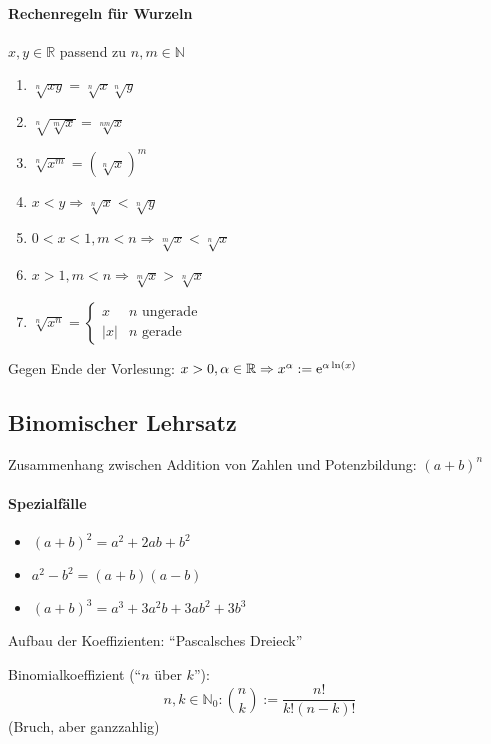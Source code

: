 \paragraph{Rechenregeln für Wurzeln} $x,y \in \mathbb{R}$ passend zu $n,m \in\mathbb{N}$
\begin{enumerate}
 \item $\sqrt[n]{xy} = \sqrt[n]x \sqrt[n]y$
 \item $\sqrt[n]{\sqrt[m]x} = \sqrt[nm]x$
 \item $\sqrt[n]{x^m} = (\sqrt[n]x)^m$
 \item $x<y \Rightarrow \sqrt[n]x < \sqrt[n]y$
 \item $0<x<1, m<n \Rightarrow \sqrt[m]{x} < \sqrt[n]{x}$
 \item $x>1, m<n \Rightarrow \sqrt[m]x > \sqrt[n]x$
 \item $\sqrt[n]{x^n} = \begin{cases} x & n \text{ ungerade} \\ |x| & n \text{ gerade} \end{cases}$
\end{enumerate}


\induction

Gegen Ende der Vorlesung: $x > 0, \alpha \in \mathbb{R} \Rightarrow x^\alpha := \operatorname{e}^{\alpha \operatorname{ln}(x)}$

\subsection{Binomischer Lehrsatz}

Zusammenhang zwischen Addition von Zahlen und Potenzbildung: $(a+b)^n$
\paragraph{Spezialfälle}
\begin{itemize}
 \item $(a+b)^2 = a^2+2ab+b^2$
 \item $a^2-b^2 = (a+b)(a-b)$
 \item $(a+b)^3=a^3+3a^2b+3ab^2+3b^3$
\end{itemize}

Aufbau der Koeffizienten: ``Pascalsches Dreieck''

\begin{definition} Binomialkoeffizient (``$n$ über $k$''):
 \[ n,k \in \mathbb{N}_0: {n \choose k} := \frac{n!}{k!(n-k)!}\]
 (Bruch, aber ganzzahlig)
\end{definition}

